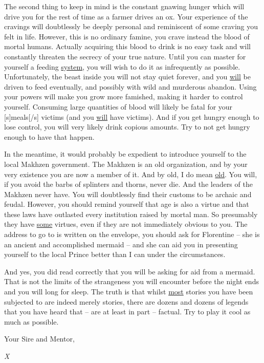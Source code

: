 {The second thing to keep in mind is the constant gnawing hunger which will drive you for the rest of time as a farmer drives an ox. Your experience of the cravings will doubtlessly be deeply personal and reminiscent of some craving you felt in life. However, this is no ordinary famine, you crave instead the blood of mortal humans. Actually acquiring this blood to drink is no easy task and will constantly threaten the secrecy of your true nature. Until you can master for yourself a feeding \uline{system}, you will wish to do it as infrequently as possible. Unfortunately, the beast inside you will not stay quiet forever, and you \uline{will} be driven to feed eventually, and possibly with wild and murderous abandon. Using your powers will make you grow more famished, making it harder to control yourself. Consuming large quantities of blood will likely be fatal for your [s]meals[/s] victims (and you \uline{will} have victims). And if you get hungry enough to lose control, you will very likely drink copious amounts. Try to not get hungry enough to have that happen.

In the meantime, it would probably be expedient to introduce yourself to the local Makhzen government. The Makhzen is an old organization, and by your very existence you are now a member of it. And by old, I do mean \uline{old}. You will, if you avoid the barbs of splinters and thorns, never die. And the leaders of the Makhzen never have. You will doubtlessly find their customs to be archaic and feudal. However, you should remind yourself that age is also a virtue and that these laws have outlasted every institution raised by mortal man. So presumably they have \uline{some} virtues, even if they are not immediately obvious to you. The address to go to is written on the envelope, you should ask for Florentine -- she is an ancient and accomplished mermaid -- and she can aid you in presenting yourself to the local Prince better than I can under the circumstances.

And yes, you did read correctly that you will be asking for aid from a mermaid. That is not the limits of the strangeness you will encounter before the night ends and you will long for sleep. The truth is that whilst \uline{most} stories you have been subjected to are indeed merely stories, there are dozens and dozens of legends that you have heard that -- are at least in part -- factual. Try to play it cool as much as possible.

\medskip
Your Sire and Mentor,

\fontsize{17}{17} \selectfont \textit{X} \normalfont
}

